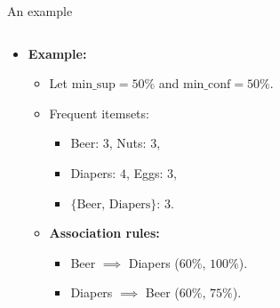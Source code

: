 \documentclass[aspectratio=169,t,xcolor=dvipsnames]{beamer}
\begin{document}
{\begin{frame}{An example}
\begin{columns}
\begin{column}{0.5\textwidth}
\begin{itemize}
            \item \textbf{Example:}
            \begin{itemize}
              \item Let $\text{min\_sup} = 50\%$ and $\text{min\_conf} = 50\%$.
              \item Frequent itemsets:
              \begin{itemize}
                \item Beer: $3$, Nuts: $3$,
                \item Diapers: $4$, Eggs: $3$,
                \item $\{\text{Beer, Diapers}\}$: $3$.
              \end{itemize}
              \item \textbf{Association rules:}
              \begin{itemize}
                \item Beer $\implies$ Diapers ($60\%$, $100\%$).
                \item Diapers $\implies$ Beer ($60\%$, $75\%$).
              \end{itemize}
            \end{itemize}
          \end{itemize}
          \end{column}
        \end{columns}
    \end{frame}
  }
\end{document}
